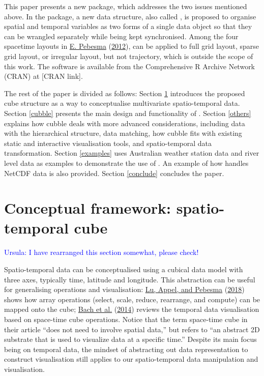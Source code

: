 \documentclass{article}
\begin{document}
This paper presents a new  package,  which addresses the two issues mentioned above. In the package, a new data structure, also called , is proposed to organise spatial and temporal variables as two forms of a single data object so that they can be wrangled separately while being kept synchronised. Among the four spacetime layouts in \protect\hyperlink{ref-spacetime}{E. Pebesma} (\protect\hyperlink{ref-spacetime}{2012}),  can be applied to full grid layout, sparse grid layout, or irregular layout, but not trajectory, which is outside the scope of this work. The software is available from the Comprehensive R Archive Network (CRAN) at {[}CRAN link{]}.

The rest of the paper is divided as follows: Section \ref{cube} introduces the proposed cube structure as a way to conceptualise multivariate spatio-temporal data. Section \ref{cubble} presents the main design and functionality of . Section \ref{others} explains how cubble deals with more advanced considerations, including data with the hierarchical structure, data matching, how cubble fits with existing static and interactive visualisation tools, and spatio-temporal data transformation. Section \ref{examples} uses Australian weather station data and river level data as examples to demonstrate the use of . An example of how  handles NetCDF data is also provided. Section \ref{conclude} concludes the paper.

\hypertarget{cube}{%
\section{Conceptual framework: spatio-temporal cube}\label{cube}}

\textcolor{blue}{Ursula: I have rearranged this section somewhat, please check!}

Spatio-temporal data can be conceptualised using a cubical data model with three axes, typically time, latitude and longitude. This abstraction can be useful for generalising operations and visualisation: \protect\hyperlink{ref-lu_multidimensional_2018}{Lu, Appel, and Pebesma} (\protect\hyperlink{ref-lu_multidimensional_2018}{2018}) shows how array operations (select, scale, reduce, rearrange, and compute) can be mapped onto the cube; \protect\hyperlink{ref-bach_review_2014}{Bach et al.} (\protect\hyperlink{ref-bach_review_2014}{2014}) reviews the temporal data visualisation based on space-time cube operations. Notice that the term space-time cube in their article ``does not need to involve spatial data,'' but refers to ``an abstract 2D substrate that is used to visualize data at a specific time.'' Despite its main focus being on temporal data, the mindset of abstracting out data representation to construct visualisation still applies to our spatio-temporal data manipulation and visualisation.
\end{document}
